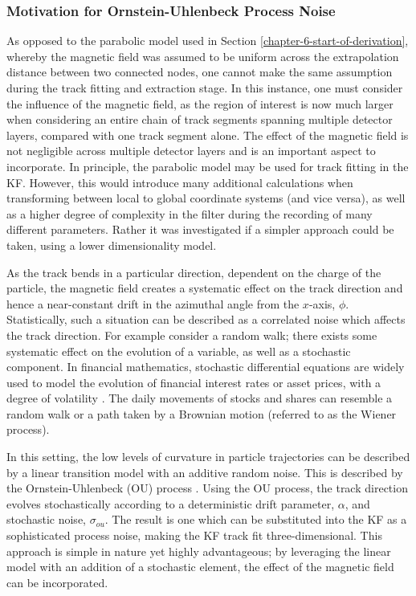 \subsubsection{Motivation for Ornstein-Uhlenbeck Process Noise}

As opposed to the parabolic model used in Section \ref{chapter-6-start-of-derivation}, whereby the magnetic field was assumed to be uniform across the extrapolation distance between two connected nodes, one cannot make the same assumption during the track fitting and extraction stage. In this instance, one must consider the influence of the magnetic field, as the region of interest is now much larger when considering an entire chain of track segments spanning multiple detector layers, compared with one track segment alone. The effect of the magnetic field is not negligible across multiple detector layers and is an important aspect to incorporate. In principle, the parabolic model may be used for track fitting in the KF. However, this would introduce many additional calculations when transforming between local to global coordinate systems (and vice versa), as well as a higher degree of complexity in the filter during the recording of many different parameters. Rather it was investigated if a simpler approach could be taken, using a lower dimensionality model.

As the track bends in a particular direction, dependent on the charge of the particle, the magnetic field creates a systematic effect on the track direction and hence a near-constant drift in the azimuthal angle from the $x$-axis, $\phi$. Statistically, such a situation can be described as a correlated noise which affects the track direction. For example consider a random walk; there exists some systematic effect on the evolution of a variable, as well as a stochastic component. In financial mathematics, stochastic differential equations are widely used to model the evolution of financial interest rates or asset prices, with a degree of volatility \cite{financial-maths-sde}. The daily movements of stocks and shares can resemble a random walk or a path taken by a Brownian motion (referred to as the Wiener process). 

In this setting, the low levels of curvature in particle trajectories can be described by a linear transition model with an additive random noise. This is described by the Ornstein-Uhlenbeck (OU) process \cite{OU}. Using the OU process, the track direction evolves stochastically according to a deterministic drift parameter, $\alpha$, and stochastic noise, $\sigma_{ou}$. The result is one which can be substituted into the KF as a sophisticated process noise, making the KF track fit three-dimensional. This approach is simple in nature yet highly advantageous; by leveraging the linear model with an addition of a stochastic element, the effect of the magnetic field can be incorporated.


